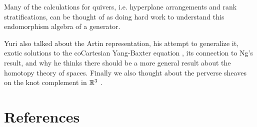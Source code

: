 \documentclass[12pt]{article}
\begin{document}
\hfill

Many of the calculations for quivers, i.e. hyperplane arrangements and
rank stratifications, can be thought of as doing hard work to understand this 
endomorphism algebra of a generator. 

\hfill

Yuri also talked about the Artin representation, his attempt to generalize it, 
exotic solutions to the coCartesian Yang-Baxter equation , its 
connection to Ng's result, and why he thinks there should be a more general 
result about the homotopy theory of spaces. Finally we also 
thought about the perverse sheaves on the knot complement in $\mathbb{R}^3$ . 

\section{References}
{}

\end{document}
